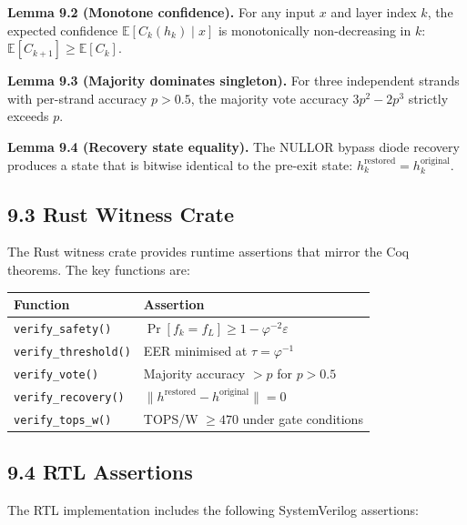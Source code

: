 \textbf{Lemma 9.2 (Monotone confidence).}
For any input \(x\) and layer index \(k\), the
expected confidence
\(\mathbb{E}[C_k(h_k) \mid x]\) is monotonically
non-decreasing in \(k\):
\(\mathbb{E}[C_{k+1}] \ge \mathbb{E}[C_k]\).

\textbf{Lemma 9.3 (Majority dominates singleton).}
For three independent strands with per-strand
accuracy \(p > 0.5\), the majority vote accuracy
\(3p^2 - 2p^3\) strictly exceeds \(p\).

\textbf{Lemma 9.4 (Recovery state equality).}
The NULLOR bypass diode recovery produces a state
that is bitwise identical to the pre-exit state:
\(h_k^{\text{restored}} = h_k^{\text{original}}\).

\subsection{9.3 Rust Witness Crate}

The Rust witness crate
 provides runtime
assertions that mirror the Coq theorems. The key
functions are:

\begin{longtable}[]{@{}
  >{\raggedright\arraybackslash}p{}
  >{\raggedright\arraybackslash}p{}@{}}
\toprule\noalign{}
Function & Assertion \\
\midrule\noalign{}
\endhead
\bottomrule\noalign{}
\endlastfoot
\texttt{verify\_safety()} & \(\Pr[f_k = f_L] \ge 1 - \varphi^{-2}\varepsilon\) \\
\texttt{verify\_threshold()} & EER minimised at \(\tau = \varphi^{-1}\) \\
\texttt{verify\_vote()} & Majority accuracy \(> p\) for \(p > 0.5\) \\
\texttt{verify\_recovery()} & \(\|h^{\text{restored}} - h^{\text{original}}\| = 0\) \\
\texttt{verify\_tops\_w()} & TOPS/W \(\ge 470\) under gate conditions \\
\end{longtable}

\subsection{9.4 RTL Assertions}

The RTL implementation includes the following
SystemVerilog assertions:

